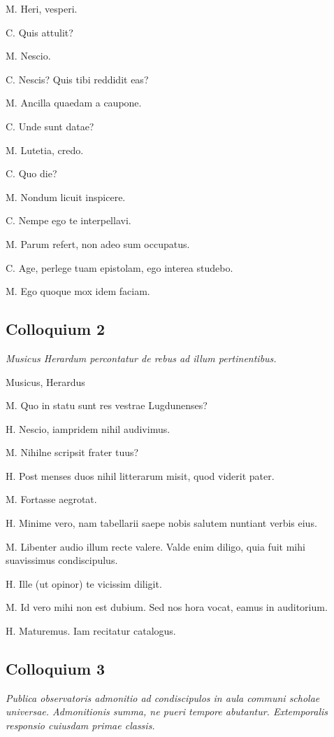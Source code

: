 \documentclass{article}
\begin{document}
M. Heri, vesperi.

C. Quis attulit?

M. Nescio.

C. Nescis? Quis tibi reddidit eas?

M. Ancilla quaedam a caupone. 

C. Unde sunt datae?

M. Lutetia, credo. 

C. Quo die?

M. Nondum licuit inspicere. 

C. Nempe ego te interpellavi. 

M. Parum refert, non adeo sum occupatus. 

C. Age, perlege tuam epistolam, ego interea studebo. 

M. Ego quoque mox idem faciam. 

\subsection{Colloquium 2}
\emph{Musicus Herardum percontatur de rebus ad illum pertinentibus.}

Musicus, Herardus

M. Quo in statu sunt res vestrae Lugdunenses?

H. Nescio, iampridem nihil audivimus. 

M. Nihilne scripsit frater tuus?

H. Post menses duos nihil litterarum misit, quod viderit pater. 

M. Fortasse aegrotat. 

H. Minime vero, nam tabellarii saepe nobis salutem nuntiant verbis eius. 

M. Libenter audio illum recte valere. Valde enim diligo, quia fuit mihi suavissimus condiscipulus. 

H. Ille (ut opinor) te vicissim diligit. 

M. Id vero mihi non est dubium. Sed nos hora vocat, eamus in auditorium. 

H. Maturemus. Iam recitatur catalogus.

\subsection{Colloquium 3} %
\emph{Publica observatoris admonitio ad condiscipulos in aula communi scholae universae. Admonitionis summa, ne pueri tempore abutantur. Extemporalis responsio cuiusdam primae classis.}
\end{document}
